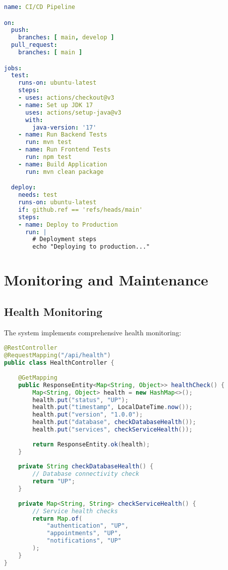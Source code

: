 \documentclass[12pt,a4paper]{article}
\begin{document}
\begin{lstlisting}[language=YAML, caption=GitHub Actions Workflow]
name: CI/CD Pipeline

on:
  push:
    branches: [ main, develop ]
  pull_request:
    branches: [ main ]

jobs:
  test:
    runs-on: ubuntu-latest
    steps:
    - uses: actions/checkout@v3
    - name: Set up JDK 17
      uses: actions/setup-java@v3
      with:
        java-version: '17'
    - name: Run Backend Tests
      run: mvn test
    - name: Run Frontend Tests
      run: npm test
    - name: Build Application
      run: mvn clean package

  deploy:
    needs: test
    runs-on: ubuntu-latest
    if: github.ref == 'refs/heads/main'
    steps:
    - name: Deploy to Production
      run: |
        # Deployment steps
        echo "Deploying to production..."
\end{lstlisting}

\section{Monitoring and Maintenance}

\subsection{Health Monitoring}

The system implements comprehensive health monitoring:

\begin{lstlisting}[language=Java, caption=Health Check Endpoint]
@RestController
@RequestMapping("/api/health")
public class HealthController {
    
    @GetMapping
    public ResponseEntity<Map<String, Object>> healthCheck() {
        Map<String, Object> health = new HashMap<>();
        health.put("status", "UP");
        health.put("timestamp", LocalDateTime.now());
        health.put("version", "1.0.0");
        health.put("database", checkDatabaseHealth());
        health.put("services", checkServiceHealth());
        
        return ResponseEntity.ok(health);
    }
    
    private String checkDatabaseHealth() {
        // Database connectivity check
        return "UP";
    }
    
    private Map<String, String> checkServiceHealth() {
        // Service health checks
        return Map.of(
            "authentication", "UP",
            "appointments", "UP",
            "notifications", "UP"
        );
    }
}
\end{lstlisting}
\end{document}
